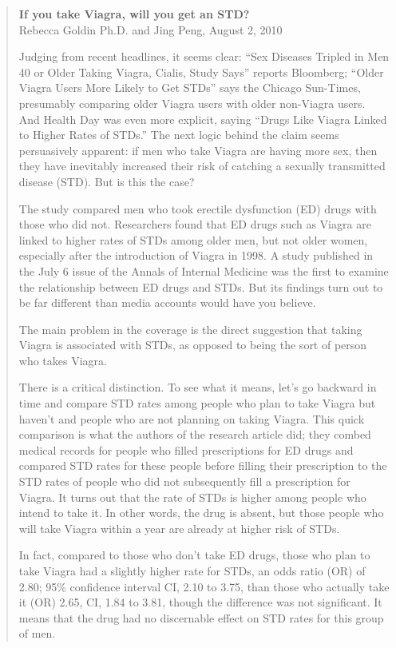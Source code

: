 \documentclass[11pt]{book}\usepackage[]{graphicx}\usepackage[]{color}
\begin{document}
\begin{quotation}
\textbf{If you take Viagra, will you get an STD?} \\
Rebecca Goldin Ph.D. and Jing Peng, August 2, 2010 

Judging from recent headlines, it seems clear:  ``Sex Diseases Tripled in Men 40 or Older Taking Viagra, Cialis, Study Says'' reports Bloomberg; ``Older Viagra Users More Likely to Get STDs'' says the Chicago Sun-Times, presumably comparing older Viagra users with older non-Viagra users.  And Health Day was even more explicit, saying ``Drugs Like Viagra Linked to Higher Rates of STDs.''  The next logic behind the claim seems persuasively apparent: if men who take Viagra are having more sex, then they have inevitably increased their risk of catching a sexually transmitted disease (STD). But is this the case?

The study compared men who took erectile dysfunction (ED) drugs with those who did not.  Researchers found that ED drugs such as Viagra are linked to higher rates of STDs among older men, but not older women, especially after the introduction of Viagra in 1998.  A study published in the July 6 issue of the Annals of Internal Medicine was the first to examine the relationship between ED drugs and STDs. But its findings turn out to be far different than media accounts would have you believe.

The main problem in the coverage is the direct suggestion that taking Viagra is associated with STDs, as opposed to being the sort of person who takes Viagra.

There is a critical distinction. To see what it means, let's go backward in time and compare STD rates among people who plan to take Viagra but haven't and people who are not planning on taking Viagra. This quick comparison is what the authors of the research article did; they combed medical records for people who filled prescriptions for ED drugs and compared STD rates for these people before filling their prescription to the STD rates of people who did not subsequently fill a prescription for Viagra.  It turns out that the rate of STDs is higher among people who intend to take it.  In other words, the drug is absent, but those people who will take Viagra within a year are already at higher risk of STDs.

In fact, compared to those who don't take ED drugs, those who plan to take Viagra had a slightly higher rate for STDs, an odds ratio (OR) of 2.80; 95\% confidence interval CI, 2.10 to 3.75, than those who actually take it (OR) 2.65, CI, 1.84 to 3.81, though the difference was not significant. It means that the drug had no discernable effect on STD rates for this group of men.
\citep{goldin2010}
\end{quotation}
\end{document}
